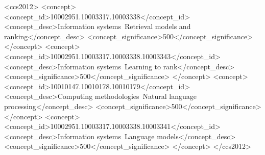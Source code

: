 \begin{CCSXML}
<ccs2012>
   <concept>
       <concept_id>10002951.10003317.10003338</concept_id>
       <concept_desc>Information systems~Retrieval models and ranking</concept_desc>
       <concept_significance>500</concept_significance>
       </concept>
   <concept>
       <concept_id>10002951.10003317.10003338.10003343</concept_id>
       <concept_desc>Information systems~Learning to rank</concept_desc>
       <concept_significance>500</concept_significance>
       </concept>
   <concept>
       <concept_id>10010147.10010178.10010179</concept_id>
       <concept_desc>Computing methodologies~Natural language processing</concept_desc>
       <concept_significance>500</concept_significance>
       </concept>
   <concept>
       <concept_id>10002951.10003317.10003338.10003341</concept_id>
       <concept_desc>Information systems~Language models</concept_desc>
       <concept_significance>500</concept_significance>
       </concept>
 </ccs2012>
\end{CCSXML}

{\begin{sloppypar}
\end{sloppypar}}


